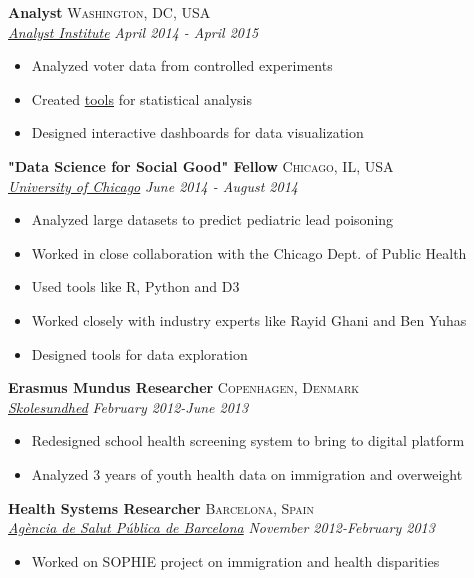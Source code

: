 \documentclass[11pt]{article}
\begin{document}
\noindent \textbf{Analyst} \hfill \textsc{Washington, DC, USA}\\
\noindent \emph{\href{https://analystinstitute.org/}{Analyst Institute}} \hfill \emph{April 2014 - April 2015}
\vspace{-2mm}
\begin{itemize}\itemsep0pt \parskip0pt 
\item Analyzed voter data from controlled experiments
\item Created \href{https://analystinstitute.org/power-calculator/}{tools} for statistical analysis 
\item Designed interactive dashboards for data visualization
\end{itemize}


\noindent \textbf{"Data Science for Social Good" Fellow} \hfill \textsc{Chicago, IL, USA}\\
\noindent \emph{\href{http://www.uchicago.edu/}{University of Chicago}} \hfill \emph{June 2014 - August 2014}
\vspace{-2mm}
\begin{itemize}\itemsep0pt \parskip0pt 
\item Analyzed large datasets to predict pediatric lead poisoning
\item Worked in close collaboration with the Chicago Dept. of Public Health
\item Used tools like R, Python and D3
\item Worked closely with industry experts like Rayid Ghani and Ben Yuhas
\item Designed tools for data exploration
\end{itemize}


\noindent \textbf{Erasmus Mundus Researcher} \hfill \textsc{Copenhagen, Denmark}\\
\noindent \emph{\href{https://www.skolesundhed.dk/Default.aspx}{Skolesundhed}} \hfill \emph{February 2012-June 2013}
\vspace{-2mm}
\begin{itemize}\itemsep0pt \parskip0pt 
\item Redesigned school health screening system to bring to digital platform 
\item Analyzed 3 years of youth health data on immigration and overweight
\end{itemize}

\noindent \textbf{Health Systems Researcher} \hfill \textsc{Barcelona, Spain}\\
\noindent \emph{\href{http://www.aspb.cat/}{Agència de Salut Pública de Barcelona}} \hfill \emph{November 2012-February 2013}
\vspace{-2mm}
\begin{itemize}\itemsep0pt \parskip0pt 
\item Worked on SOPHIE project on immigration and health disparities 
\end{itemize}
\end{document}
